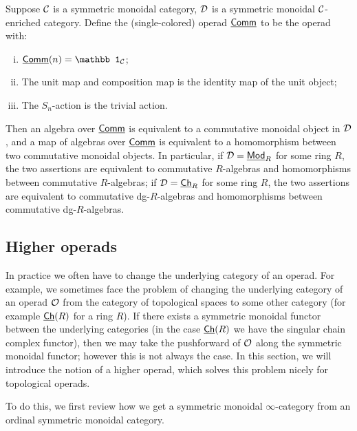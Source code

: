 \documentclass[twoside]{article}
\begin{document}
\begin{example}\label{eg2}
    Suppose $\cal C$ is a symmetric monoidal category, 
    $\cal D$ is a symmetric monoidal $\cal C$-enriched category. Define the 
    (single-colored) operad $\underline{\mathsf{Comm}}$ to be the operad with:
    \begin{enumerate}[i)]
        \item $\Comm(n)=\mathbb1_{\cal C}$;
        \item The unit map and composition map is the identity map of the unit object;
        \item The $S_n$-action is the trivial action.
    \end{enumerate}
    Then an algebra over $\underline{\mathsf{Comm}}$ is equivalent to a commutative monoidal object
    in $\cal D$, and a map of algebras over $\underline{\mathsf{Comm}}$ is equivalent to a homomorphism
    between two commutative monoidal objects. In particular, if $\mathcal D=\underline{\smash{\mathsf{Mod}}}_R$
    for some ring $R$, the two assertions are equivalent to
    commutative $R$-algebras and homomorphisms between commutative $R$-algebras;
    if $\mathcal D=\underline{\mathsf{Ch}}_R$ for some ring $R$, the two assertions are equivalent to
    commutative dg-$R$-algebras and homomorphisms between 
    commutative dg-$R$-algebras.
\end{example}

\subsection{Higher operads}

In practice we often have to change the underlying category of an operad. 
For example, we sometimes face the problem of changing
the underlying category of an operad $\cal O$ from the category of
topological spaces to some other category (for example $\underline{\mathsf{Ch}}(R)$ for a ring $R$).
If there exists a symmetric monoidal
functor between the underlying categories (in the case $\underline{\mathsf{Ch}}(R)$
we have the singular chain complex functor), then we may take the pushforward of $\cal O$
along the symmetric monoidal functor; however this is not always the case.
In this section, we will introduce the notion of a higher operad,
which solves this problem nicely for topological operads.

To do this, we first review how we get a symmetric monoidal 
$\infty$-category from an ordinal symmetric monoidal 
category. 
\end{document}
